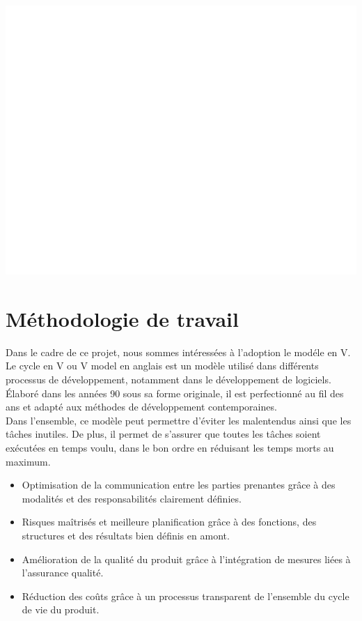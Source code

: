 \documentclass[12pt]{report}
\begin{document}
\includegraphics[width=1\textwidth]{untitled}
\section{Méthodologie de travail}
Dans le cadre de ce projet, nous sommes intéressées à l’adoption le modéle en V.\\
Le cycle en V ou V model en anglais est un modèle utilisé dans différents processus de développement, notamment dans le développement de logiciels. Élaboré dans les années 90 sous sa forme originale, il est perfectionné au fil des ans et adapté aux méthodes de développement contemporaines.\\
Dans l’ensemble, ce modèle peut permettre d’éviter les malentendus ainsi que les tâches inutiles. De plus, il permet de s’assurer que toutes les tâches soient exécutées en temps voulu, dans le bon ordre en réduisant les temps morts au maximum.
\begin{itemize}
\item Optimisation de la communication entre les parties prenantes grâce à des modalités et des responsabilités clairement définies.
\item Risques maîtrisés et meilleure planification grâce à des fonctions, des structures et des résultats bien définis en amont.
\item Amélioration de la qualité du produit grâce à l’intégration de mesures liées à l’assurance qualité.
\item Réduction des coûts grâce à un processus transparent de l’ensemble du cycle de vie du produit.
\end{itemize}
\end{document}
